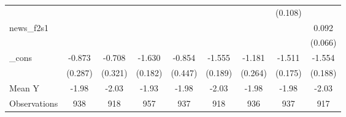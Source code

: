 {\begin{tabular}{l*{8}{c}}
            &                     &                     &                     &                     &                     &                     &     (0.108)         &                     \\
\addlinespace
news\_f2s1   &                     &                     &                     &                     &                     &                     &                     &       0.092         \\
            &                     &                     &                     &                     &                     &                     &                     &     (0.066)         \\
\addlinespace
\_cons      &      -0.873\sym{***}&      -0.708\sym{**} &      -1.630\sym{***}&      -0.854\sym{*}  &      -1.555\sym{***}&      -1.181\sym{***}&      -1.511\sym{***}&      -1.554\sym{***}\\
            &     (0.287)         &     (0.321)         &     (0.182)         &     (0.447)         &     (0.189)         &     (0.264)         &     (0.175)         &     (0.188)         \\
\midrule
Mean Y      &       -1.98         &       -2.03         &       -1.93         &       -1.98         &       -2.03         &       -1.98         &       -1.98         &       -2.03         \\
Observations&         938         &         918         &         957         &         937         &         918         &         936         &         937         &         917         \\
\bottomrule
\end{tabular}
}
